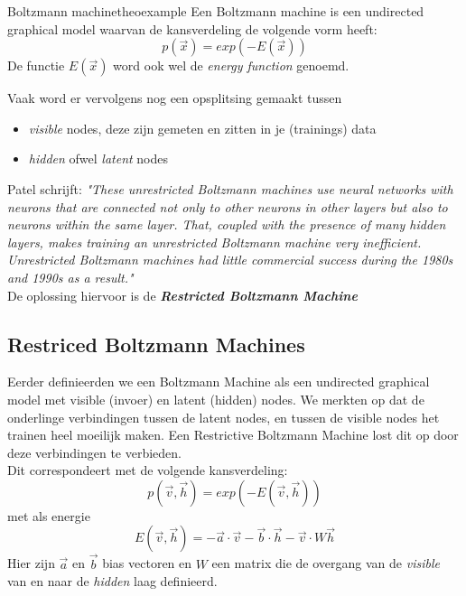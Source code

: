{\begin{mytheo}{Boltzmann machine}{theoexample}
Een Boltzmann machine is een undirected graphical model waarvan de kansverdeling de volgende vorm heeft:
\[p(\vec{x})=exp(-E(\vec{x}))\]
De functie $E(\vec{x})$ word ook wel de \textit{energy function} genoemd.
\end{mytheo}
\noindent Vaak word er vervolgens nog een opsplitsing gemaakt tussen
\begin{itemize}
    \item \textit{visible} nodes, deze zijn gemeten en zitten in je (trainings) data
    \item \textit{hidden} ofwel \textit{latent} nodes
\end{itemize}
Patel schrijft:
\textit{"These unrestricted Boltzmann machines use neural networks with neurons that are connected not only to other neurons in other layers but also to neurons within the same layer. That, coupled with the presence of many hidden layers, makes training an unrestricted Boltzmann machine very inefficient. Unrestricted Boltzmann machines had little commercial success during the 1980s and 1990s as a result."}\\

\noindent De oplossing hiervoor is de \textit{\textbf{Restricted Boltzmann Machine}}
\subsection{Restriced Boltzmann Machines}
Eerder definieerden we een Boltzmann Machine als een undirected graphical model met visible (invoer) en latent (hidden) nodes. We merkten op dat de onderlinge verbindingen tussen de latent nodes, en tussen de visible nodes het trainen heel moeilijk maken. Een Restrictive Boltzmann Machine lost dit op door deze verbindingen te verbieden.\\

\noindent Dit correspondeert met de volgende kansverdeling:
\[p(\vec{v},\vec{h})=exp(-E(\vec{v},\vec{h}))\]
met als energie
\[E(\vec{v},\vec{h})=-\vec{a}\cdot \vec{v}-\vec{b}\cdot \vec{h}-\vec{v}\cdot W\vec{h}\]
Hier zijn $\vec{a}$ en $\vec{b}$ bias vectoren en $W$ een matrix die de overgang van de \textit{visible} van en naar de \textit{hidden} laag definieerd.
}
